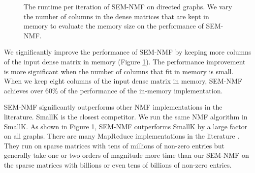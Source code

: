 \begin{figure}
	\begin{center}
		\footnotesize
		
		\caption{The runtime per iteration of SEM-NMF on directed graphs.
			We vary the number of columns in the dense matrices that are kept
		in memory to evaluate the memory size on the performance of SEM-NMF.}
		\label{perf:NMF}
	\end{center}
\end{figure}

We significantly improve the performance of SEM-NMF by keeping more columns
of the input dense matrix in memory (Figure \ref{perf:NMF}). The performance
improvement is more significant when the number of columns that fit in memory
is small. When we keep eight columns of the input dense matrix in memory,
SEM-NMF achieves over 60\% of the performance of the in-memory implementation.

SEM-NMF significantly outperforms other NMF implementations in the literature.
SmallK is the closest competitor. We run the same NMF algorithm
in SmallK. As shown in Figure \ref{perf:NMF}, SEM-NMF outperforms SmallK by
a large factor on all graphs. There are many MapReduce implementations in
the literature \cite{Liao14, Yin14, Liu10}. They run on sparse
matrices with tens of millions of non-zero entries but generally take
one or two orders of magnitude more time than our SEM-NMF on the sparse matrices
with billions or even tens of billions of non-zero entries.
